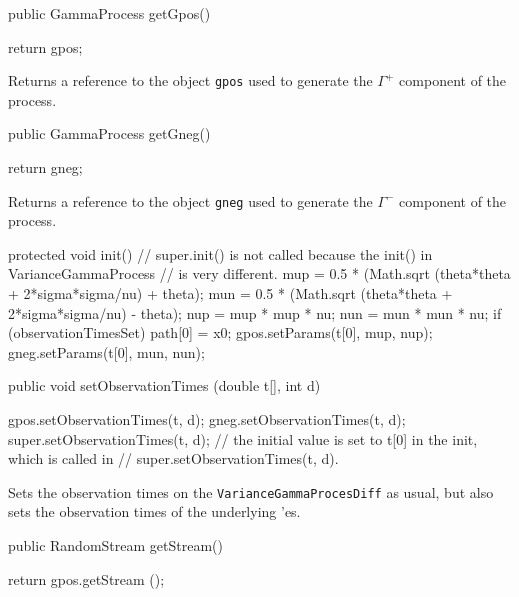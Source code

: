 \begin{code}

   public GammaProcess getGpos() \begin{hide} {
        return gpos;
    }\end{hide}
\end{code}
\begin{tabb} Returns a reference to the  object \texttt{gpos}
used to generate the $\Gamma^{+}$ component of the process.
\end{tabb}
\begin{code}

   public GammaProcess getGneg() \begin{hide} {
        return gneg;
    }\end{hide}
\end{code}
\begin{tabb} Returns a reference to the  object \texttt{gneg}
used to generate the $\Gamma^{-}$ component of the process.
\end{tabb}
\begin{code}\begin{hide}

    protected void init() {
        // super.init() is not called because the init() in VarianceGammaProcess
        // is very different.
        mup = 0.5 * (Math.sqrt (theta*theta + 2*sigma*sigma/nu) + theta);
        mun = 0.5 * (Math.sqrt (theta*theta + 2*sigma*sigma/nu) - theta);
        nup = mup * mup * nu;
        nun = mun * mun * nu;
        if (observationTimesSet) {
            path[0] = x0;
            gpos.setParams(t[0], mup, nup);
            gneg.setParams(t[0], mun, nun);
        }
    }\end{hide}

   public void setObservationTimes (double t[], int d) \begin{hide} {
         gpos.setObservationTimes(t, d);
         gneg.setObservationTimes(t, d);
         super.setObservationTimes(t, d);
// the initial value is set to t[0] in the init, which is called in
// super.setObservationTimes(t, d).
     }\end{hide}
\end{code}
\begin{tabb} Sets the observation times on the \texttt{VarianceGammaProcesDiff}
as usual, but also sets the observation times of the underlying
'es.
\end{tabb}
\begin{code}

   public RandomStream getStream() \begin{hide} {
      return gpos.getStream ();
   }\end{hide}
\end{code}
